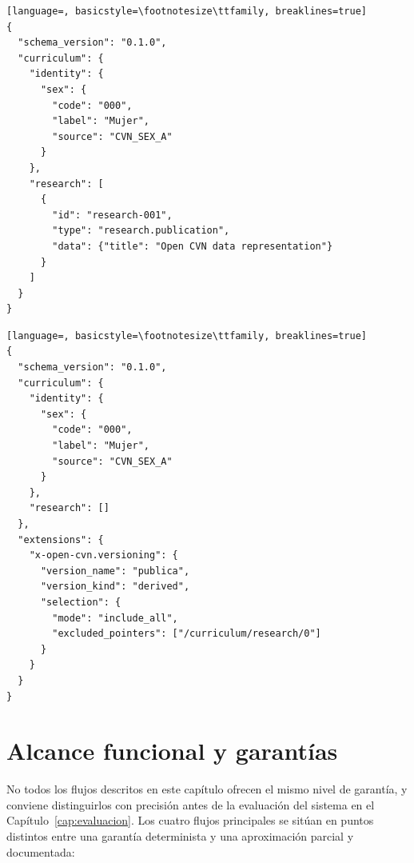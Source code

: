 \begin{code}[htbp]
\begin{lstlisting}[language=, basicstyle=\footnotesize\ttfamily, breaklines=true]
{
  "schema_version": "0.1.0",
  "curriculum": {
    "identity": {
      "sex": {
        "code": "000",
        "label": "Mujer",
        "source": "CVN_SEX_A"
      }
    },
    "research": [
      {
        "id": "research-001",
        "type": "research.publication",
        "data": {"title": "Open CVN data representation"}
      }
    ]
  }
}
\end{lstlisting}
\caption{Currículo maestro reducido, con una entrada de investigación.}
\label{cod:formato_maestro}
\end{code}

\begin{code}[htbp]
\begin{lstlisting}[language=, basicstyle=\footnotesize\ttfamily, breaklines=true]
{
  "schema_version": "0.1.0",
  "curriculum": {
    "identity": {
      "sex": {
        "code": "000",
        "label": "Mujer",
        "source": "CVN_SEX_A"
      }
    },
    "research": []
  },
  "extensions": {
    "x-open-cvn.versioning": {
      "version_name": "publica",
      "version_kind": "derived",
      "selection": {
        "mode": "include_all",
        "excluded_pointers": ["/curriculum/research/0"]
      }
    }
  }
}
\end{lstlisting}
\caption{Versión derivada ``publica'' del mismo currículo, con la entrada de investigación excluida.}
\label{cod:formato_derivada}
\end{code}

\section{Alcance funcional y garantías}
\label{sec:formato_alcance}

No todos los flujos descritos en este capítulo ofrecen el mismo nivel de
garantía, y conviene distinguirlos con precisión antes de la evaluación del
sistema en el Capítulo~\ref{cap:evaluacion}. Los cuatro flujos principales se sitúan en puntos
distintos entre una garantía determinista y una aproximación parcial y
documentada:

